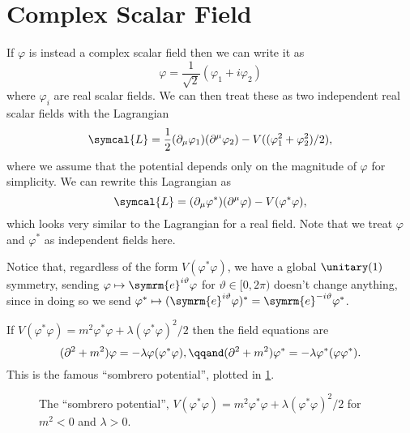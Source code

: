 \documentclass[fleqn]{NotesClass}
\newcommand{\e}{\symrm{e}}
\newcommand{\dalembertian}{\partial^2}
\newcommand{\lagrangianDensity}{\symcal{L}}
\begin{document}
    \section{Complex Scalar Field}
    If \(\varphi\) is instead a complex scalar field then we can write it as
    \begin{equation}
        \varphi = \frac{1}{\sqrt{2}} (\varphi_1 + i\varphi_2)
    \end{equation}
    where \(\varphi_i\) are real scalar fields.
    We can then treat these as two independent real scalar fields with the Lagrangian
    \begin{equation}
        \lagrangianDensity = \frac{1}{2} (\partial_\mu \varphi_1) (\partial^\mu \varphi_2) - V((\varphi_1^2 + \varphi_2^2)/2),
    \end{equation}
    where we assume that the potential depends only on the magnitude of \(\varphi\) for simplicity.
    We can rewrite this Lagrangian as
    \begin{equation}
        \lagrangianDensity = (\partial_\mu \varphi^*)(\partial^\mu \varphi) - V(\varphi^*\varphi),
    \end{equation}
    which looks very similar to the Lagrangian for a real field.
    Note that we treat \(\varphi\) and \(\varphi^*\) as independent fields here.
    
    Notice that, regardless of the form \(V(\varphi^*\varphi)\), we have a global \(\unitary(1)\) symmetry, sending \(\varphi \mapsto \e^{i\vartheta}\varphi\) for \(\vartheta \in [0, 2\pi)\) doesn't change anything, since in doing so we send \(\varphi^* \mapsto (\e^{i\vartheta}\varphi)^* = \e^{-i\vartheta}\varphi^*\).
    
    If \(V(\varphi^*\varphi) = m^2 \varphi^*\varphi + \lambda(\varphi^*\varphi)^2/2\) then the field equations are
    \begin{equation}
        (\dalembertian + m^2)\varphi = -\lambda \varphi(\varphi^* \varphi), \qqand (\dalembertian + m^2) \varphi^* = -\lambda \varphi^*(\varphi\varphi^*).
    \end{equation}
    This is the famous \enquote{sombrero potential}, plotted in \cref{fig:sombrero potential}.
    
    \begin{figure}
        \caption{The \enquote{sombrero potential}, \(V(\varphi^*\varphi) = m^2\varphi^*\varphi + \lambda(\varphi^*\varphi)^2/2\) for \(m^2 < 0\) and \(\lambda > 0\).}
        \label{fig:sombrero potential}
    \end{figure}
    
\end{document}
